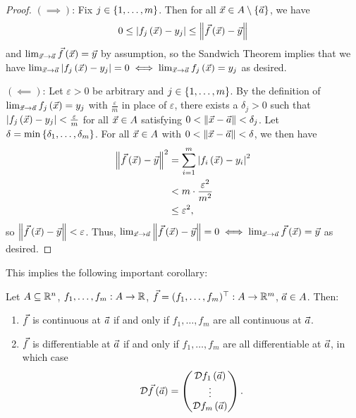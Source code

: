 \documentclass[main.tex]{subfiles}
\begin{document}
\begin{proof}
    $(\implies)$: Fix $j\in \left\{ 1, \ldots , m \right\}$. Then for all $\vec{x}\in A\setminus \left\{ \vec{a} \right\}$, we have
    \[0 \le \left\lvert f_j\left( \vec{x} \right) - y_j \right\rvert \le \left\lVert \vec{f}\left( \vec{x} \right) - \vec{y} \right\rVert\]
    and $\lim_{\vec{x}\to \vec{a}}\vec{f}\left( \vec{x} \right) = \vec{y}$ by assumption, so the Sandwich Theorem implies that we have $\lim_{\vec{x}\to \vec{a}} \left\lvert f_j\left( \vec{x} \right) - y_j \right\rvert = 0 \iff \lim_{\vec{x}\to \vec{a}} f_j\left( \vec{x} \right) = y_j$ as desired.

    $(\impliedby)$: Let $\varepsilon > 0$ be arbitrary and $j\in \left\{ 1, \ldots , m \right\}$. By the definition of $\lim_{\vec{x}\to \vec{a}} f_j\left( \vec{x} \right) = y_j$ with $\frac{\varepsilon}{m}$ in place of $\varepsilon$, there exists a $\delta_j > 0$ such that $\left\lvert f_j\left( \vec{x} \right) - y_j \right\rvert < \frac{\varepsilon}{m}$
    for all $\vec{x}\in A$ satisfying $0 < \left\lVert \vec{x} - \vec{a} \right\rVert < \delta_j$. Let $\delta = \min\left\{ \delta_1, \ldots , \delta_m \right\}$. For all $\vec{x}\in A$ with $0 < \left\lVert \vec{x} - \vec{a} \right\rVert < \delta$, we then have
    \begin{align*}
        \left\lVert \vec{f}\left( \vec{x} \right) - \vec{y} \right\rVert^2 &= \sum_{i = 1}^m \left\lvert f_i\left( \vec{x} \right) - y_i \right\rvert^2 \\
        &< m\cdot \frac{\varepsilon^2}{m^2} \\
        &\le \varepsilon^2,
    \end{align*}
    so $\left\lVert \vec{f}\left( \vec{x} \right) - \vec{y} \right\rVert < \varepsilon$. Thus, $\lim_{\vec{x}\to \vec{a}} \left\lVert \vec{f}\left( \vec{x} \right) - \vec{y} \right\rVert = 0 \iff \lim_{\vec{x}\to \vec{a}} \vec{f}\left( \vec{x} \right) = \vec{y}$ as desired.
\end{proof}

This implies the following important corollary:

\begin{corollary}
    Let $A\subseteq \mathbb R^n$, $f_1 , \ldots , f_m : A \to \mathbb R$, $\vec{f} = (f_1, \ldots , f_m)^\top : A \to \mathbb R^m$, $\vec{a}\in A$. Then:
    \begin{enumerate}
        \item $\vec{f}$ is continuous at $\vec{a}$ if and only if $f_1, \ldots , f_m$ are all continuous at $\vec{a}$.
        \item $\vec{f}$ is differentiable at $\vec{a}$ if and only if $f_1, \ldots , f_m$ are all differentiable at $\vec{a}$, in which case
        \[\mathcal{D}\vec{f}\left( \vec{a} \right) = \begin{pmatrix}
            \mathcal{D}f_1\left( \vec{a} \right) \\
            \vdots \\
            \mathcal{D}f_m\left( \vec{a} \right)
        \end{pmatrix}.\]
    \end{enumerate}
\end{corollary}
\end{document}

